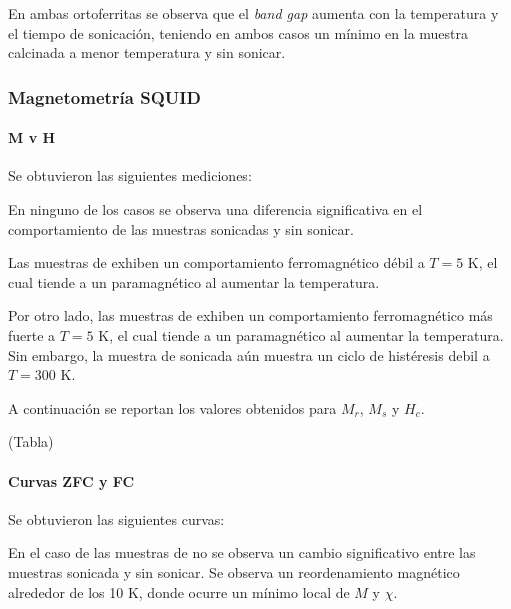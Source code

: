 \documentclass[../main.tex]{subfiles}
\begin{document}
En ambas ortoferritas se observa que el \textit{band gap} aumenta con la temperatura y el tiempo de sonicación, teniendo en ambos casos un mínimo en la muestra calcinada a menor temperatura y sin sonicar.
\subsubsection{Magnetometría SQUID}

\paragraph{M v H}
Se obtuvieron las siguientes mediciones:


En ninguno de los casos se observa una diferencia significativa en el comportamiento de las muestras sonicadas y sin sonicar.

Las muestras de \neod{} exhiben un comportamiento ferromagnético débil a $T=5$ K, el cual tiende a un paramagnético al aumentar la temperatura.

Por otro lado, las muestras de \sama{} exhiben un comportamiento ferromagnético más fuerte a $T=5$ K, el cual tiende a un paramagnético al aumentar la temperatura. Sin embargo, la muestra de \sama{} sonicada aún muestra un ciclo de histéresis debil a $T=300$ K.

A continuación se reportan los valores obtenidos para $M_r$, $M_s$ y $H_c$.

(Tabla)
\paragraph{Curvas ZFC y FC}
Se obtuvieron las siguientes curvas:



En el caso de las muestras de \neod{} no se observa un cambio significativo entre las muestras sonicada y sin sonicar. Se observa un reordenamiento magnético alrededor de los 10 K, donde ocurre un mínimo local de $M$ y $\chi$.
\end{document}
